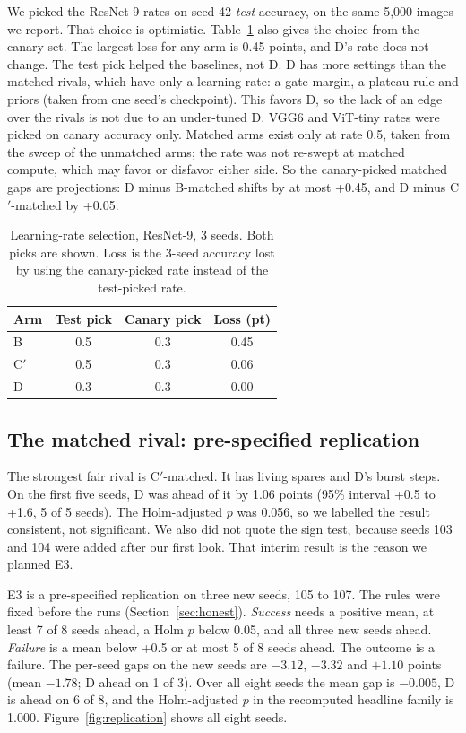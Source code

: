 \documentclass[journal]{IEEEtran}
\begin{document}
We picked the ResNet-9 rates on seed-42 \emph{test} accuracy, on the same 5,000 images we report.
That choice is optimistic.
Table~\ref{tab:lr} also gives the choice from the canary set.
The largest loss for any arm is 0.45 points, and D's rate does not change.
The test pick helped the baselines, not D.
D has more settings than the matched rivals, which have only a learning rate: a gate margin, a plateau rule and priors (taken from one seed's checkpoint).
This favors D, so the lack of an edge over the rivals is not due to an under-tuned D.
VGG6 and ViT-tiny rates were picked on canary accuracy only.
Matched arms exist only at rate 0.5, taken from the sweep of the unmatched arms; the rate was not re-swept at matched compute, which may favor or disfavor either side.
So the canary-picked matched gaps are projections: D minus B-matched shifts by at most +0.45, and D minus C$'$-matched by +0.05.

\begin{table}[t]
\centering
\caption{Learning-rate selection, ResNet-9, 3 seeds. Both picks are shown. Loss is the 3-seed accuracy lost by using the canary-picked rate instead of the test-picked rate.}
\label{tab:lr}
\small
\begin{tabular}{lccc}
\toprule
Arm & Test pick & Canary pick & Loss (pt) \\
\midrule
B & 0.5 & 0.3 & 0.45 \\
C$'$ & 0.5 & 0.3 & 0.06 \\
D & 0.3 & 0.3 & 0.00 \\
\bottomrule
\end{tabular}
\end{table}

\subsection{The matched rival: pre-specified replication}
\label{sec:replication}
The strongest fair rival is C$'$-matched.
It has living spares and D's burst steps.
On the first five seeds, D was ahead of it by 1.06 points (95\% interval +0.5 to +1.6, 5 of 5 seeds).
The Holm-adjusted $p$ was 0.056, so we labelled the result consistent, not significant.
We also did not quote the sign test, because seeds 103 and 104 were added after our first look.
That interim result is the reason we planned E3.

E3 is a pre-specified replication on three new seeds, 105 to 107.
The rules were fixed before the runs (Section~\ref{sec:honest}).
\emph{Success} needs a positive mean, at least 7 of 8 seeds ahead, a Holm $p$ below 0.05, and all three new seeds ahead.
\emph{Failure} is a mean below +0.5 or at most 5 of 8 seeds ahead.
The outcome is a failure.
The per-seed gaps on the new seeds are $-3.12$, $-3.32$ and $+1.10$ points (mean $-1.78$; D ahead on 1 of 3).
Over all eight seeds the mean gap is $-0.005$, D is ahead on 6 of 8, and the Holm-adjusted $p$ in the recomputed headline family is 1.000.
Figure~\ref{fig:replication} shows all eight seeds.
\end{document}
